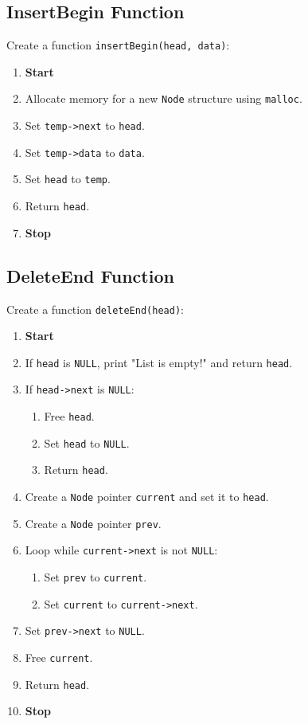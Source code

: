 {  \subsection{InsertBegin Function}
  Create a function \texttt{insertBegin(head, data)}:
  \begin{enumerate}[label=\arabic*:,left=0pt]
    \item \textbf{Start}
    \item Allocate memory for a new \texttt{Node} structure using \texttt{malloc}.
    \item Set \texttt{temp->next} to \texttt{head}.
    \item Set \texttt{temp->data} to \texttt{data}.
    \item Set \texttt{head} to \texttt{temp}.
    \item Return \texttt{head}.
    \item \textbf{Stop}
  \end{enumerate}

  \subsection{DeleteEnd Function}
  Create a function \texttt{deleteEnd(head)}:
  \begin{enumerate}[label=\arabic*:,left=0pt]
    \item \textbf{Start}
    \item If \texttt{head} is \texttt{NULL}, print "List is empty!" and return \texttt{head}.
    \item If \texttt{head->next} is \texttt{NULL}:
          \begin{enumerate}[label=3.\arabic*:, start=1]
            \item Free \texttt{head}.
            \item Set \texttt{head} to \texttt{NULL}.
            \item Return \texttt{head}.
          \end{enumerate}
    \item Create a \texttt{Node} pointer \texttt{current} and set it to \texttt{head}.
    \item Create a \texttt{Node} pointer \texttt{prev}.
    \item Loop while \texttt{current->next} is not \texttt{NULL}:
          \begin{enumerate}[label=3.\arabic*:, start=1]
            \item Set \texttt{prev} to \texttt{current}.
            \item Set \texttt{current} to \texttt{current->next}.
          \end{enumerate}
    \item Set \texttt{prev->next} to \texttt{NULL}.
    \item Free \texttt{current}.
    \item Return \texttt{head}.
    \item \textbf{Stop}
  \end{enumerate}

}
